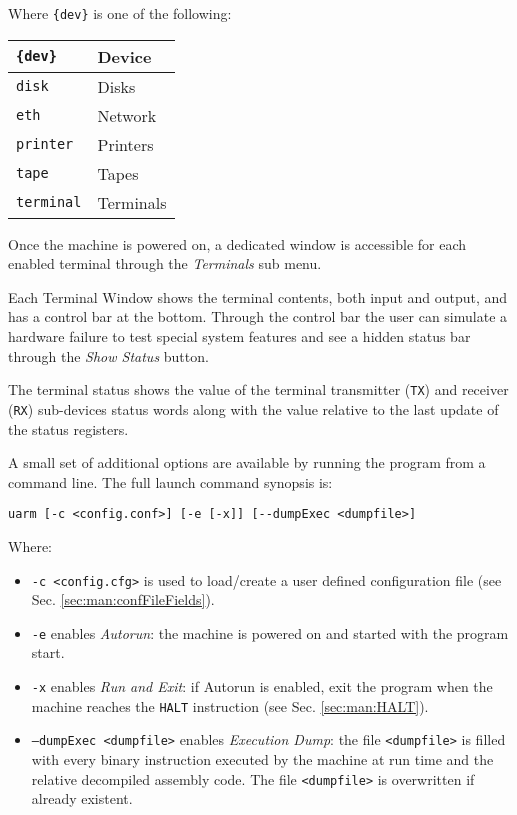 \vspace{6pt}
Where \texttt{\{dev\}} is one of the following:

\vspace{4pt}
\noindent
\begin{center}
\begin{tabular}{|l|l|}
	\hline
	\texttt{\{dev\}} & Device \\
	\hline
	\hline
	\texttt{disk} & Disks\\
	\hline
	\texttt{eth} & Network\\
	\hline
	\texttt{printer} & Printers\\
	\hline
	\texttt{tape} & Tapes\\
	\hline
	\texttt{terminal} & Terminals\\
	\hline
\end{tabular}
\end{center}


Once the machine is powered on, a dedicated window is accessible for each enabled terminal through the \emph{Terminals} sub menu.

Each Terminal Window shows the terminal contents, both input and output, and has a control bar at the bottom.
Through the control bar the user can simulate a hardware failure to test special system features and see a hidden status bar through the \emph{Show Status} button.

The terminal status shows the value of the terminal transmitter (\texttt{TX}) and receiver (\texttt{RX}) sub-devices status words along with the  value relative to the last update of the status registers.

\label{sec:man:commandLineOptions}

A small set of additional options are available by running the program from a command line.
The full launch command synopsis is:

\noindent
\begin{lstlisting}
uarm [-c <config.conf>] [-e [-x]] [--dumpExec <dumpfile>]
\end{lstlisting}

Where:\\
\begin{itemize}
	\item \texttt{-c <config.cfg>} is used to load/create a user defined configuration file (see Sec. \ref{sec:man:confFileFields}).
	\item \texttt{-e} enables \emph{Autorun}: the machine is powered on and started with the program start.
	\item \texttt{-x} enables \emph{Run and Exit}: if Autorun is enabled, exit the program when the machine reaches the \texttt{HALT} instruction (see Sec. \ref{sec:man:HALT}).
	\item \texttt{--dumpExec <dumpfile>} enables \emph{Execution Dump}: the file \texttt{<dumpfile>} is filled with every binary instruction executed by the machine at run time and the relative decompiled assembly code. The file \texttt{<dumpfile>} is overwritten if already existent.
\end{itemize}

